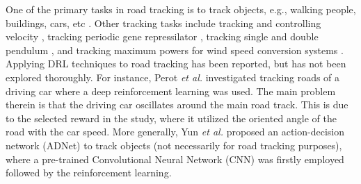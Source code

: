 \documentclass{svproc}
\begin{document}
	One of the primary tasks in road tracking is to track objects, e.g., walking people, buildings, cars, etc \cite{Grigore2000Reinforcement,Cohen2010Reinforcement,Liu2004Reinforcement,Supancic2017Tracking}. %
	Other tracking tasks include tracking and controlling velocity \cite{Jinlin2009Neurofuzzy}, tracking periodic gene repressilator \cite{Sootla2013On}, tracking single and double pendulum \cite{Hall2011Reinforcement}, and tracking maximum powers for wind speed conversion systems \cite{Wei2015Reinforcement}. 
	Applying DRL techniques to road tracking has been reported, but has not been explored thoroughly.  For instance, Perot \emph{et al.} \cite{Perot2017End} investigated tracking roads of a driving car where a deep reinforcement learning was used. The main problem therein is that the driving car oscillates around the main road track. This is due to the selected reward in the study, where it utilized the oriented angle of the road with the car speed. %
	More generally, Yun \textit{et al.} \cite{Yun2017Action,Yun2018Action} proposed an action-decision network (ADNet) to track objects (not necessarily for road tracking purposes), %
	where a pre-trained Convolutional Neural Network (CNN) was firstly employed followed by the reinforcement learning. 
\end{document}
